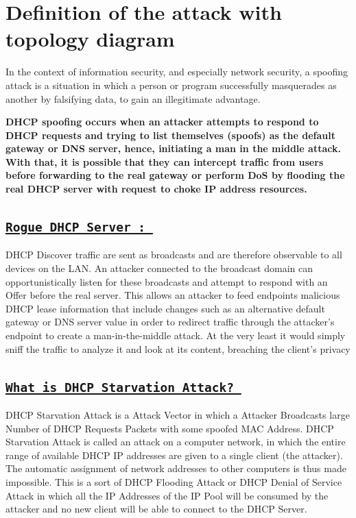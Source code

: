 \documentclass[12pt]{article}
\begin{document}
\begin{sloppypar}
\begin{sloppypar}
\end{sloppypar}

\section{Definition of the attack with topology diagram}

\begin{sloppypar}
	
	In the context of information security, and especially network security, a spoofing attack is a situation in which a person or program successfully masquerades as another by falsifying data, to gain an illegitimate advantage.
	
	
	\textbf{DHCP spoofing occurs when an attacker attempts to respond to DHCP requests and trying to list themselves (spoofs) as the default gateway or DNS server, hence, initiating a man in the middle attack. With that, it is possible that they can intercept traffic from users before forwarding to the real gateway or perform DoS by flooding the real DHCP server with request to choke IP address resources.}
	
	
	
	\subsection{\texttt{\underline{Rogue DHCP Server : } }}
	
	
	
	DHCP Discover traffic are sent as broadcasts and are therefore observable to all devices on the LAN.  An attacker connected to the broadcast domain can opportunistically listen for these broadcasts and attempt to respond with an Offer before the real server.  This allows an attacker to feed endpoints malicious DHCP lease information that include changes such as an alternative default gateway or DNS server value in order to redirect traffic through the attacker’s endpoint to create a man-in-the-middle attack. At the very least it would simply sniff the traffic to analyze it and look at its content, breaching the client's privacy
	
	
	\subsection{\texttt{\underline{What is DHCP Starvation Attack? } }}
	
	DHCP Starvation Attack is a Attack Vector in which a Attacker Broadcasts large Number of DHCP Requests Packets with some spoofed MAC Address. DHCP Starvation Attack is called an attack on a computer network, in which the entire range of available DHCP IP addresses are given to a single client (the attacker). The automatic assignment of network addresses to other computers is thus made impossible. This is a sort of DHCP Flooding Attack or DHCP Denial of Service Attack in which all the IP Addresses of the IP Pool will be consumed by the attacker and no new client will be able to connect to the DHCP Server.
	

\end{sloppypar}
\end{sloppypar}
\end{document}
